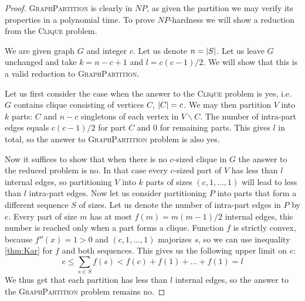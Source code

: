 \begin{proof}
\textsc{GraphPartition} is clearly in $NP$,
as given the partition we may verify its properties in a polynomial time.
To prove $NP$-hardness we will show a reduction from the \textsc{Clique} problem.

We are given graph $G$ and integer $c$.
Let us denote $n = \left\vert S \right\vert$.
Let us leave $G$ unchanged and take $k = n-c+1$ and $l = c(c-1)/2$.
We will show that this is a valid reduction to \textsc{GraphPartition}.

Let us first consider the case when the answer to the \textsc{Clique} problem is yes,
i.e. $G$ contains clique consisting of vertices $C$, $\left\vert C \right\vert = c$.
We may then partition $V$ into $k$ parts: $C$ and $n-c$ singletons of each vertex in $V \backslash C$.
The number of intra-part edges equals $c(c-1)/2$ for part $C$ and $0$ for remaining parts.
This gives $l$ in total, so the answer to \textsc{GraphPartition} problem is also yes.

Now it suffices to show that when there is no $c$-sized clique in $G$
the answer to the reduced problem is no.
In that case every $c$-sized part of $V$ has less than $l$ internal edges,
so partitioning $V$ into $k$ parts of sizes $(c, 1, ..., 1)$ will lead to less than $l$ intra-part edges.
Now let us consider partitioning $P$ into parts that form a different sequence $S$ of sizes.
Let us denote the number of intra-part edges in $P$ by $e$.
Every part of size $m$ has at most $f(m) = m(m-1)/2$ internal edges,
this number is reached only when a part forms a clique.
Function $f$ is strictly convex, because $f''(x) = 1 > 0$ and $(c,1,...,1)$ majorizes $s$,
so we can use inequality \ref{thm:Kar} for $f$ and both sequences.
This gives us the following upper limit on $e$:
$$e \leq \sum_{s\in{S}} f(s) < f(c) + f(1) + ... + f(1) = l$$
We thus get that each partition has less than $l$ internal edges,
so the answer to the \textsc{GraphPartition} problem remains no.
\end{proof}

